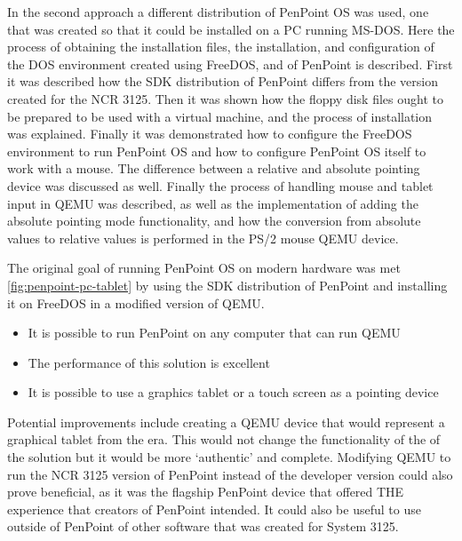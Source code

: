In the second approach a different distribution of PenPoint OS was used, one
that was created so that it could be installed on a PC running MS-DOS.  Here the
process of obtaining the installation files, the installation, and configuration
of the DOS environment created using FreeDOS, and of PenPoint is described.
First it was described how the SDK distribution of PenPoint differs from the
version created for the NCR 3125.  Then it was shown how the floppy disk files
ought to be prepared to be used with a virtual machine, and the process of
installation was explained.  Finally it was demonstrated how to configure the
FreeDOS environment to run PenPoint OS and how to configure PenPoint OS itself
to work with a mouse.  The difference between a relative and absolute pointing
device was discussed as well.  Finally the process of handling mouse and tablet
input in QEMU was described, as well as the implementation of adding the
absolute pointing mode functionality, and how the conversion from absolute
values to relative values is performed in the PS/2 mouse QEMU device.


The original goal of running PenPoint OS on modern hardware was met
\ref{fig:penpoint-pc-tablet} by using the SDK distribution of PenPoint and
installing it on FreeDOS in a modified version of QEMU.

\begin{itemize}
    \item
        It is possible to run PenPoint on any computer that can run QEMU
    \item
        The performance of this solution is excellent
    \item
        It is possible to use a graphics tablet or a touch screen as a pointing
        device
\end{itemize}


Potential improvements include creating a QEMU device that would represent
a graphical tablet from the era.  This would not change the functionality of the
of the solution but it would be more `authentic' and complete.  Modifying QEMU
to run the NCR 3125 version of PenPoint instead of the developer version could
also prove beneficial, as it was the flagship PenPoint device that offered THE
experience that creators of PenPoint intended.  It could also be useful to use
outside of PenPoint of other software that was created for System 3125.


